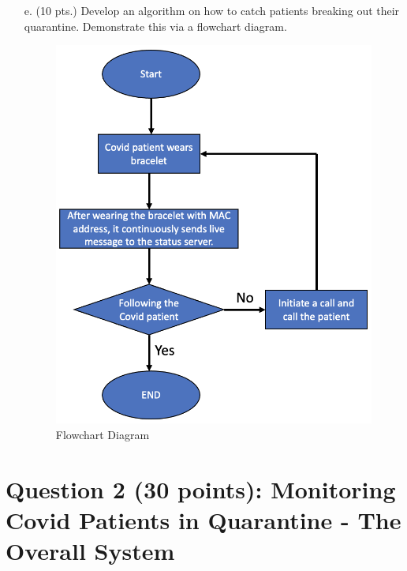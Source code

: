 \documentclass[a4paper, 11pt]{report}
\begin{document}
{\begin{enumerate}
\item[e.] (10 pts.) Develop an algorithm on how to catch patients breaking out their quarantine. Demonstrate this via a flowchart diagram.
\begin{figure}[h]
\includegraphics[scale=.33]{2.png}
\centering
\caption{Flowchart Diagram}
\end{figure}
\end{enumerate}

\section*{\textbf{Question 2 (30 points): Monitoring Covid Patients in Quarantine - The Overall System}}

}
\end{document}
